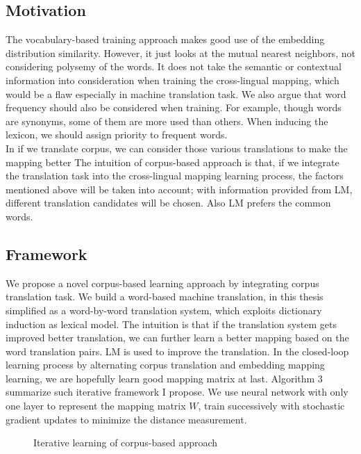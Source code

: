 \subsection{Motivation}
The vocabulary-based training approach makes good use of the  embedding distribution similarity. However, it just looks at the mutual nearest neighbors, not considering polysemy of the words.  It does not take the semantic or contextual information into consideration when training the cross-lingual mapping, which would be a flaw especially in machine translation task. We also argue that word frequency should also be considered when training. For example, though words are synonyms, some of them are more used than others. When inducing the lexicon, we should assign priority to frequent words.\\
In if we translate corpus, we can consider those various translations to make the mapping better 
The intuition of corpus-based approach is that, if we integrate the translation task into the cross-lingual mapping learning process, the factors mentioned above will be taken into account; with information provided from LM, different translation candidates will be chosen. Also  LM prefers the common words. 
\subsection{Framework}
 We propose a novel corpus-based learning approach by integrating corpus translation task. We build a word-based machine translation, in this thesis simplified as a word-by-word translation system, which exploits dictionary induction as lexical model. The intuition is that if the translation system gets improved better translation, we can further learn a better mapping based on the word translation pairs. LM is used to improve the translation. In the closed-loop learning process by alternating corpus translation and embedding mapping learning, we are hopefully learn good mapping matrix at last. Algorithm 3 summarize such iterative framework I propose. We use neural network with only one layer to represent the mapping matrix $W$, train successively with stochastic gradient updates to minimize the distance measurement.\\
\begin{figure}[H]
	\centering
	\begin{minipage}{.7\linewidth}
		\begin{algorithm}[H]
			\SetAlgoLined
			\caption{Iterative learning of corpus-based approach}
		\end{algorithm}
	\end{minipage}
\end{figure}

